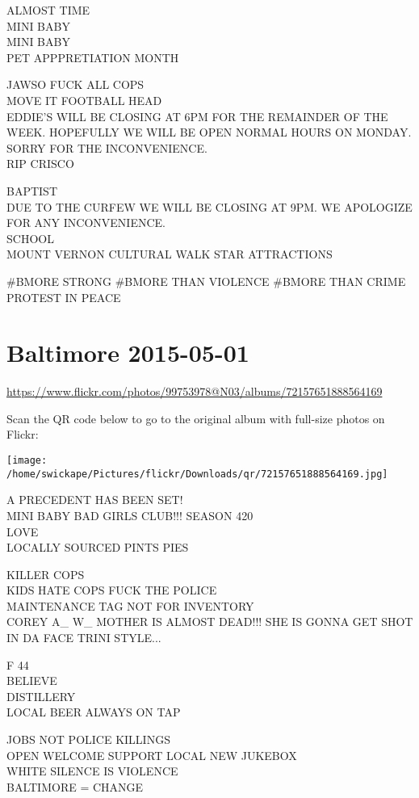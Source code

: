 \documentclass[10pt,letterpaper]{article}
\begin{document}
ALMOST TIME\\
MINI BABY\\
MINI BABY\\
PET APPPRETIATION MONTH

JAWSO FUCK ALL COPS\\
MOVE IT FOOTBALL HEAD\\
EDDIE'S WILL BE CLOSING AT 6PM FOR THE REMAINDER OF THE WEEK.  HOPEFULLY WE WILL BE OPEN NORMAL HOURS ON MONDAY.  SORRY FOR THE INCONVENIENCE.\\
RIP CRISCO

BAPTIST\\
DUE TO THE CURFEW WE WILL BE CLOSING AT 9PM.  WE APOLOGIZE FOR ANY INCONVENIENCE.\\
SCHOOL\\
MOUNT VERNON CULTURAL WALK STAR ATTRACTIONS

\#BMORE STRONG \#BMORE THAN VIOLENCE \#BMORE THAN CRIME PROTEST IN PEACE


\section*{Baltimore 2015-05-01}

\url{https://www.flickr.com/photos/99753978@N03/albums/72157651888564169}

Scan the QR code below to go to the original album with full-size photos on Flickr:

\texttt{[image: /home/swickape/Pictures/flickr/Downloads/qr/72157651888564169.jpg]}


A PRECEDENT HAS BEEN SET!\\
MINI BABY BAD GIRLS CLUB!!! SEASON 420\\
LOVE\\
LOCALLY SOURCED PINTS PIES

KILLER COPS\\
KIDS HATE COPS FUCK THE POLICE\\
MAINTENANCE TAG NOT FOR INVENTORY\\
COREY A\_ W\_ MOTHER IS ALMOST DEAD!!!  SHE IS GONNA GET SHOT IN DA FACE TRINI STYLE...

F 44\\
BELIEVE\\
DISTILLERY\\
LOCAL BEER ALWAYS ON TAP

JOBS NOT POLICE KILLINGS\\
OPEN WELCOME SUPPORT LOCAL NEW JUKEBOX\\
WHITE SILENCE IS VIOLENCE\\
BALTIMORE = CHANGE
\end{document}
